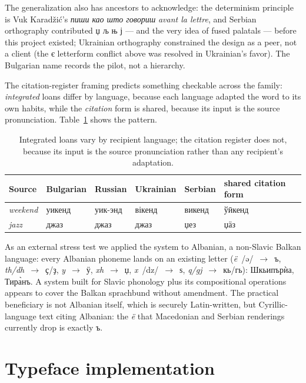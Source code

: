 \documentclass[12pt]{article}
\newcommand{\cz}[1]{{\chu #1}}
\newcommand{\ph}[1]{{\ipafont/#1/}}
\begin{document}
The generalization also has ancestors to acknowledge: the determinism principle is Vuk Karad\v{z}i\'c's \emph{пиши као што говориш} \emph{avant la lettre}, and Serbian orthography contributed \cz{џ љ њ ј} — and the very idea of fused palatals — before this project existed; Ukrainian orthography constrained the design as a peer, not a client (the є letterform conflict above was resolved in Ukrainian's favor). The Bulgarian name records the pilot, not a hierarchy.

The citation-register framing predicts something checkable across the family: \emph{integrated} loans differ by language, because each language adapted the word to its own habits, while the \emph{citation} form is shared, because its input is the source pronunciation. Table~\ref{tab:multibase} shows the pattern.

\begin{table}[ht]\centering\small
\begin{tabular}{llllll}
\toprule
Source & Bulgarian & Russian & Ukrainian & Serbian & shared citation form \\
\midrule
\emph{weekend} & \cz{уикенд} & \cz{уик-энд} & \cz{вікенд} & \cz{викенд} & \cz{ўӣкенд} \\
\emph{jazz} & \cz{джаз} & \cz{джаз} & \cz{джаз} & \cz{џез} & \cz{џӓз} \\
\bottomrule
\end{tabular}
\caption{Integrated loans vary by recipient language; the citation register does not, because its input is the source pronunciation rather than any recipient's adaptation.}
\label{tab:multibase}
\end{table}

As an external stress test we applied the system to Albanian, a non-Slavic Balkan language: every Albanian phoneme lands on an existing letter (\emph{ë}~\ph{ə}~$\rightarrow$~\cz{ъ}, \emph{th/dh}~$\rightarrow$~\cz{ҫ}/\cz{ҙ}, \emph{y}~$\rightarrow$~\cz{ӱ}, \emph{xh}~$\rightarrow$~\cz{џ}, \emph{x}~\ph{dz}~$\rightarrow$~\cz{ѕ}, \emph{q/gj}~$\rightarrow$~\cz{кь}/\cz{гь}): \cz{Шкьипърѝа}, \cz{Тира̀нъ}. A system built for Slavic phonology plus its compositional operations appears to cover the Balkan sprachbund without amendment. The practical beneficiary is not Albanian itself, which is securely Latin-written, but Cyrillic-language text citing Albanian: the \emph{ë} that Macedonian and Serbian renderings currently drop is exactly \cz{ъ}.

\section{Typeface implementation}
\end{document}
